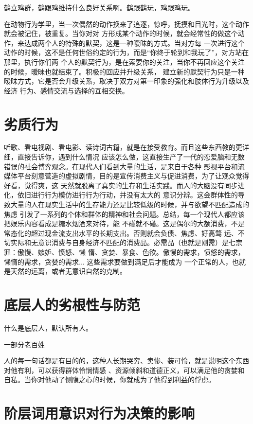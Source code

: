 \documentclass{book}
\begin{document}
鹤立鸡群，鹤跟鸡维持什么良好关系啊。鹤跟鹤玩，鸡跟鸡玩。

在动物行为学里，当一次偶然的动作换来了追逐，惊呼，抚摸和目光时，这个动作就会被记住，被重复。当你对对
方形成某个动作的时候，就会经常性的做这个动作，来达成两个人的特殊的默契，这是一种暧昧的方式。当对方每
一次进行这个动作的时候，这不是任何世俗约定的行为，而是“你终于轮到和我玩了”，对方站在那里，执行你们两
个人的默契行为，是在索要你的关注，当你不再回应这个关注的时候，暧昧也就结束了。积极的回应并升级关系，
建立新的默契行为只是一种暧昧方式，它是否会升级关系，取决于双方对第一印象的强化和肢体行为升级以及经济
行为、感情交流与选择的互相交换。

\section{劣质行为}

听歌、看电视剧、看电影、读诗词古籍，就是在接受教育。而且这些东西教的更详细，直接告诉你，遇到什么情况
应该怎么做，这直接生产了一代的恋爱脑和无数错误的社会博弈观念。在现代人们看到大量的生活，是来自于各种
影视平台和流媒体平台刻意营造的虚拟剧情，目的是宣传消费主义与促进消费，为了让观众觉得好看，觉得爽，这
天然就脱离了真实的生存和生活实践。而人的大脑没有同步进化，依旧进行行为模仿进行行为行动，并没有太大的
意识分辨。这会群体性的导致大量的人在现实生活中的生存能力还是比较低级的时候，并与欲望不匹配造成的焦虑
引发了一系列的个体和群体的精神和社会问题。总结，每一个现代人都应该把娱乐内容看成是糖水烟酒来对待，能
不碰就不碰。这是偶尔的大额消费，不是常态化的超过现金流支出水平的长期支出。否则就会负债、焦虑、好高骛
远、不切实际和无意识消费与自身经济不匹配的消费品。必需品（也就是刚需）是七宗罪：傲慢、嫉妒、愤怒、懒
惰、贪婪、暴食、色欲。傲慢的需求，愤怒的需求，懒惰的需求，贪婪的需求... 这些需求要做到满足后才能成为
一个正常的人，也就是天然的远离，或者无意识自然的克制。

\section{底层人的劣根性与防范}

什么是底层人，默认所有人。

一部分老百姓

人的每一句话都是有目的的，这种人长期哭穷、卖惨、装可怜，就是说明这个东西对他有利，可以获得群体怜悯情感
、资源倾斜和道德正义，可以满足他的贪婪和自私。当你对他动了恻隐之心的时候，你就成为了他得到利益的俘虏。

\section{阶层词用意识对行为决策的影响}
\end{document}
